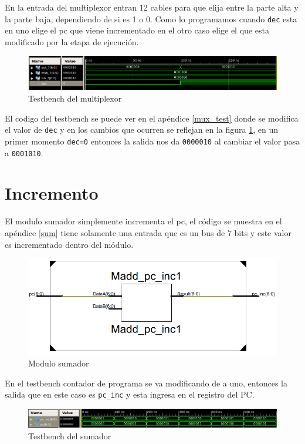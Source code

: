 En la entrada del multiplexor entran 12 cables para que elija entre la parte alta y la parte baja, dependiendo de si es 1 o 0. Como lo programamos cuando \texttt{dec} esta en uno elige el \ac{pc}  que viene incrementado en el otro caso elige el que esta modificado por la etapa de ejecución.

\begin{figure}[H]
\centering
\includegraphics[scale=0.4]{Capitulo01/mux_test}
\caption{Testbench del multiplexor}
\label{fig:muxt}
\end{figure}

El codigo del testbench se puede ver en el apéndice \ref{mux_test} donde se modifica el valor de \texttt{dec} y en los cambios que ocurren se reflejan en la figura \ref{fig:muxt}, en un primer momento \texttt{dec=0} entonces la salida nos da \texttt{0000010} al cambiar el valor pasa a \texttt{0001010}.

\section{Incremento}
El modulo sumador simplemente incrementa el \ac{pc}, el código se muestra en el apéndice \ref{sum}  tiene solamente una entrada que es un bus de 7 bits y este valor es incrementado dentro del m\'odulo. 


\begin{figure}[H]
\centering
\includegraphics[scale=0.45]{img/sumador_inside}
\caption{Modulo sumador}
\label{fig:sumador}
\end{figure}


En el testbench contador de programa se va modificando de a uno, entonces la salida que en este caso es \texttt{pc\_inc} y esta ingresa en el registro del \ac{PC}. 


\begin{figure}[H]
\centering
\includegraphics[scale=0.45]{Capitulo01/sum_test}
\caption{Testbench del sumador}
\label{fig:sumt}
\end{figure}



